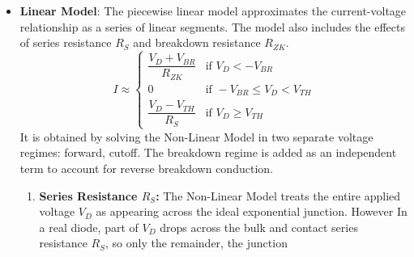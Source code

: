 \begin{enumerate}
\begin{itemize}
        is a more accurate model that takes into account the forward voltage
        drop and the reverse saturation current. It is a good approximation
        at low and moderate currents; at high currents the series
        resistance \(R_S\) and high level injection take over.
        \[
          I = I_S \left( e^{\frac{V_D}{n V_T}} - 1 \right)
        \]
        where:
        \begin{itemize}
          \item \(I\) is the current through the diode.
          \item \(I_S\) is the reverse saturation current.
          \item \(V_D\) is the voltage across the diode.
          \item \(n\) is the ideality factor (typically between 1
            and 2).
          \item \(V_T\) is the thermal voltage, given by \(V_T = \frac{kT}{q}\).
        \end{itemize}
        This model does not account for the reverse breakdown conduction of
        the diode, nor does it account for the series or breakdown resistance
        of the diode.
      \item \textbf{Linear Model}: The piecewise linear model approximates
        the current-voltage relationship as a series of linear segments.
        The model also includes the effects of series resistance \(R_S\)
        and breakdown resistance \(R_{ZK}\).
        \[
          I \approx
          \begin{cases}
            \dfrac{V_D + V_{BR}}{R_{ZK}} & \text{if } V_D < -V_{BR} \\[2mm]
            0 & \text{if } -V_{BR} \leq V_D < V_{TH} \\[2mm]
            \dfrac{V_D - V_{TH}}{R_S} & \text{if } V_D \geq V_{TH}
          \end{cases}
        \]
        It is obtained by solving the Non-Linear Model in two separate
        voltage regimes: forward, cutoff. The breakdown regime is added as
        an independent term to account for reverse breakdown conduction.
        \begin{enumerate}
          \item \textbf{Series Resistance \(R_S\):}
            The Non-Linear Model treats the entire applied voltage \(V_D\)
            as appearing across the ideal exponential junction. However In a
            real diode, part of \(V_D\) drops across the bulk and contact
            series resistance \(R_S\), so only the remainder, the junction

\end{enumerate}
\end{itemize}
\end{enumerate}
